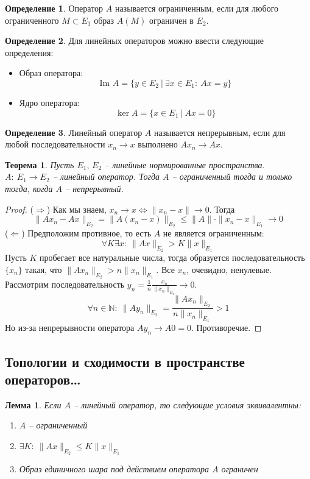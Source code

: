 \documentclass[a4paper,12pt]{article}
\renewcommand{\leq}{\ensuremath{\leqslant}}
\theoremstyle{plain}
\newtheorem{theorem}{Теорема}[section]
\newtheorem{lemma}{Лемма}[section]
\theoremstyle{definition}
\newtheorem{definition}{Определение}[section]
\theoremstyle{remark}
\begin{document}
\begin{definition}
  Оператор $A$ называется ограниченным, если для любого ограниченного $M \subset E_1$ образ $A(M)$ ограничен в $E_2$.
\end{definition}

\begin{definition}
  Для линейных операторов можно ввести следующие определения:
  \begin{itemize}
    \item Образ оператора:
    \[
      \text{Im } A = \{y \in E_2 \:\vert\: \exists x \in E_1 :\: Ax = y\}
    \]
    \item Ядро оператора:
    \[
      \ker A = \{x \in E_1 \:\vert\: Ax = 0\}
    \]
  \end{itemize}
\end{definition}

\begin{definition}
  Линейный оператор $A$ называется непрерывным, если для любой последовательности $x_n \to x$ выполнено $Ax_n \to Ax$.
\end{definition}

\begin{theorem}
  Пусть $E_1,\,E_2$ -- линейные нормированные пространства. $A :\: E_1 \to E_2$ -- линейный оператор. Тогда $A$ -- ограниченный тогда и только тогда, когда $A$ -- непрерывный.
\end{theorem}

\begin{proof}
  ($\Rightarrow$) Как мы знаем, $x_n \to x \Leftrightarrow \|x_n - x\| \to 0$. Тогда
  \[
    \|Ax_n - Ax\|_{E_2} = \|A(x_n - x)\|_{E_2} \leq \|A\| \cdot\|x_n - x\|_{E_1} \to 0
  \]
  ($\Leftarrow$) Предположим противное, то есть $A$ не является ограниченным:
  \[
    \forall K \exists x :\: \|Ax\|_{E_2} > K\|x\|_{E_1}
  \]
  Пусть $K$ пробегает все натуральные числа, тогда образуется последовательность $\{x_n\}$ такая, что $\|Ax_n\|_{E_2} > n\|x_n\|_{E_1}$. Все $x_n$, очевидно, ненулевые. Рассмотрим последовательность $y_n = \frac{1}{n}\frac{x_n}{\|x_n\|_{E_1}} \to 0$.
  \[
    \forall n \in \mathbb{N} :\: \|Ay_n\|_{E_2} = \frac{\|Ax_n\|_{E_2}}{n\|x_n\|_{E_1}} > 1
  \]
  Но из-за непрерывности оператора $Ay_n \to A0 = 0$. Противоречие.
\end{proof}

\subsection{Топологии и сходимости в пространстве операторов\dots}
\begin{lemma}
  Если $A$ -- линейный оператор, то следующие условия эквивалентны:
  \begin{enumerate}
    \item $A$ -- ограниченный
    \item $\exists K :\: \|Ax\|_{E_2} \leq K\|x\|_{E_1}$
    \item Образ единичного шара под действием оператора $A$ ограничен
  \end{enumerate}
\end{lemma}
\end{document}
